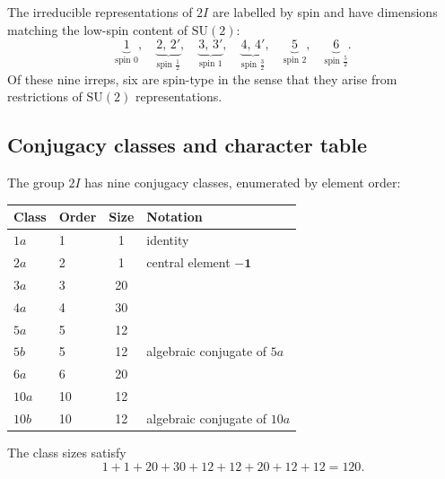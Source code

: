 \documentclass[11pt,a4paper]{article}
\begin{document}
    The irreducible representations of $2I$ are labelled by spin and have
    dimensions matching the low-spin content of $\mathrm{SU}(2)$:
    \begin{equation}
      \underbrace{1}_{\text{spin }0},\quad
      \underbrace{2,\,2'}_{\text{spin }\tfrac{1}{2}},\quad
      \underbrace{3,\,3'}_{\text{spin }1},\quad
      \underbrace{4,\,4'}_{\text{spin }\tfrac{3}{2}},\quad
      \underbrace{5}_{\text{spin }2},\quad
      \underbrace{6}_{\text{spin }\tfrac{5}{2}}.
      \label{eq:2I-irreps}
    \end{equation}
    Of these nine irreps, six are spin-type in the sense that they arise from
    restrictions of $\mathrm{SU}(2)$ representations.

  \subsection{Conjugacy classes and character table}
    \label{sec:step5-chars}

    The group $2I$ has nine conjugacy classes, enumerated by element order:
    \begin{center}
      \begin{tabular}{llcl}
        \hline
        Class & Order & Size & Notation                      \\
        \hline
        $1a$  & 1     & 1    & identity                      \\
        $2a$  & 2     & 1    & central element $-\mathbf{1}$ \\
        $3a$  & 3     & 20   &                               \\
        $4a$  & 4     & 30   &                               \\
        $5a$  & 5     & 12   &                               \\
        $5b$  & 5     & 12   & algebraic conjugate of $5a$   \\
        $6a$  & 6     & 20   &                               \\
        $10a$ & 10    & 12   &                               \\
        $10b$ & 10    & 12   & algebraic conjugate of $10a$  \\
        \hline
      \end{tabular}
    \end{center}
    The class sizes satisfy
    \[
      1+1+20+30+12+12+20+12+12 = 120.
    \]
\end{document}
